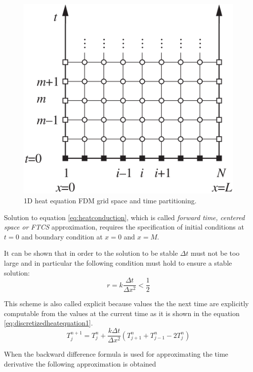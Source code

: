 \begin{figure}
\centering
\includegraphics[scale=0.3]{./images/CA_FDM/fdmgrid}
\caption{1D heat equation FDM grid space and time partitioning.}\label{torus}
\end{figure}

Solution to equation \ref{eq:heatconduction}, which is called \textit{forward time, centered space or FTCS} approximation, requires the specification of initial conditions at $t=0$ and boundary condition at $x=0$ and $x=M$.

It can be shown that in order to the solution to be stable $\Delta t$ must not be too large and in particular the following condition must hold to ensure a stable solution:
\[ 
 r= k \frac{\Delta t}{\Delta x^2}< \frac{1}{2}
\]

This scheme is also called explicit because values the the next time are explicitly computable from the values at the current time as it is shown in the equation \ref{eq:discretizedheatequation1}.
 \begin{equation}
  T^{n+1}_{j} = T^n_{j} + \frac{k \Delta t}{\Delta x^2} (T^n_{j+1}+T^n_{j-1}-2T^n_{j})
 \label{eq:discretizedheatequation1}
 \end{equation}

When the backward difference formula is used for approximating the time derivative the following approximation is obtained

